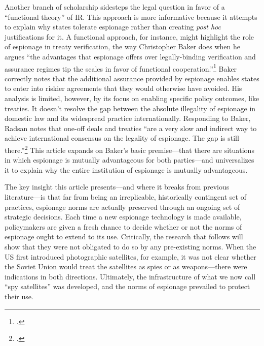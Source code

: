 \documentclass[14pt]{extarticle}
\begin{document}
Another branch of scholarship sidesteps the legal question in favor of a \enquote{functional theory} of IR. This approach is more informative because it attempts to explain why states tolerate espionage rather than creating \emph{post hoc} justifications for it. A functional approach, for instance, might highlight the role of espionage in treaty verification, the way Christopher Baker does when he argues \enquote{the advantages that espionage offers over legally-binding verification and assurance regimes tip the scales in favor of functional cooperation.}\footcite{baker_tolerance_2004} Baker correctly notes that the additional assurance provided by espionage enables states to enter into riskier agreements that they would otherwise have avoided. His analysis is limited, however, by its focus on enabling specific policy outcomes, like treaties. It doesn't resolve the gap between the absolute illegality of espionage in domestic law and its widespread practice internationally. Responding to Baker, Radsan notes that one-off deals and treaties \enquote{are a very slow and indirect way to achieve international consensus on the legality of espionage. The gap is still there.}\footcite[p.~607]{radsan_unresolved_2007} This article expands on Baker's basic premise---that there are situations in which espionage is mutually advantageous for both parties---and universalizes it to explain why the entire institution of espionage is mutually advantageous.

The key insight this article presents---and where it breaks from previous literature---is that far from being an irreplicable, historically contingent set of practices, espionage norms are actually preserved through an ongoing set of strategic decisions. Each time a new espionage technology is made available, policymakers are given a fresh chance to decide whether or not the norms of espionage ought to extend to its use. Critically, the research that follows will show that they were not obligated to do so by any pre-existing norms. When the US first introduced photographic satellites, for example, it was not clear whether the Soviet Union would treat the satellites as spies or as weapons---there were indications in both directions. Ultimately, the infrastructure of what we now call \enquote{spy satellites} was developed, and the norms of espionage prevailed to protect their use.
\end{document}
